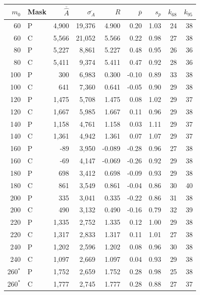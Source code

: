 \begin{tabular}{rlrrrrrrr}
\toprule
$m_0$ & Mask & $\overline{\widehat A}$ & $\overline{\sigma_A}$ & $R$ & $\overline p$ & $s_p$ & $k_{68}$ & $k_{95}$ \\
\midrule
60 & P & 4,900 & 19,376 & 4.900 & 0.20 & 1.03 & 24 & 38 \\
60 & C & 5,566 & 21,052 & 5.566 & 0.22 & 0.98 & 27 & 38 \\
80 & P & 5,227 & 8,861 & 5.227 & 0.48 & 0.95 & 26 & 36 \\
80 & C & 5,411 & 9,374 & 5.411 & 0.47 & 0.92 & 28 & 36 \\
100 & P & 300 & 6,983 & 0.300 & -0.10 & 0.89 & 33 & 38 \\
100 & C & 641 & 7,360 & 0.641 & -0.05 & 0.90 & 29 & 38 \\
120 & P & 1,475 & 5,708 & 1.475 & 0.08 & 1.02 & 29 & 37 \\
120 & C & 1,667 & 5,985 & 1.667 & 0.11 & 0.96 & 29 & 38 \\
140 & P & 1,158 & 4,761 & 1.158 & 0.03 & 1.11 & 29 & 37 \\
140 & C & 1,361 & 4,942 & 1.361 & 0.07 & 1.07 & 29 & 37 \\
160 & P & -89 & 3,950 & -0.089 & -0.28 & 0.96 & 27 & 38 \\
160 & C & -69 & 4,147 & -0.069 & -0.26 & 0.92 & 29 & 38 \\
180 & P & 698 & 3,412 & 0.698 & -0.09 & 0.93 & 29 & 38 \\
180 & C & 861 & 3,549 & 0.861 & -0.04 & 0.86 & 30 & 40 \\
200 & P & 335 & 3,041 & 0.335 & -0.22 & 0.86 & 31 & 38 \\
200 & C & 490 & 3,132 & 0.490 & -0.16 & 0.79 & 32 & 39 \\
220 & P & 1,335 & 2,752 & 1.335 & 0.12 & 1.00 & 29 & 38 \\
220 & C & 1,317 & 2,833 & 1.317 & 0.11 & 1.01 & 27 & 38 \\
240 & P & 1,202 & 2,596 & 1.202 & 0.08 & 0.96 & 30 & 38 \\
240 & C & 1,097 & 2,669 & 1.097 & 0.04 & 0.93 & 29 & 38 \\
260$^{*}$ & P & 1,752 & 2,659 & 1.752 & 0.28 & 0.98 & 25 & 38 \\
260$^{*}$ & C & 1,777 & 2,745 & 1.777 & 0.28 & 0.88 & 27 & 37 \\
\bottomrule
\end{tabular}
